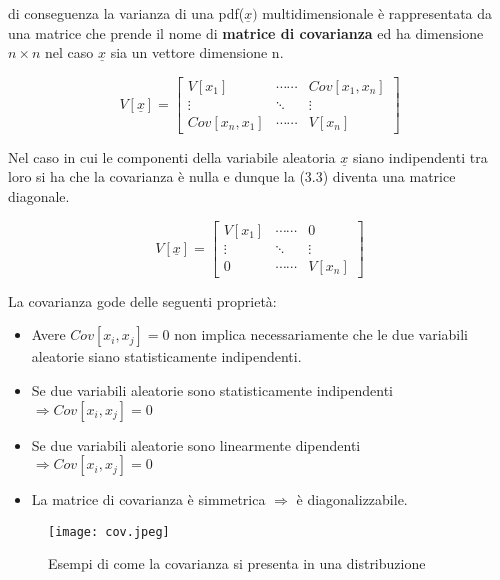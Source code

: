 \noindent di conseguenza la varianza di una pdf($\underline{x})$ multidimensionale \`{e} rappresentata da una matrice che prende il nome di \textbf{matrice di covarianza} ed ha dimensione $n \times n$ nel caso $\underline{x}$ sia un vettore dimensione n.

\begin{equation}
	V[\underline{x}] = \begin{bmatrix}
		V[x_1] & \cdots \cdots	& Cov[x_1,x_n] \\
		\vdots & \ddots & \vdots \\
		Cov[x_n,x_1] & \cdots \cdots & V[x_n]
	\end{bmatrix}
\end{equation}
\newline

\noindent Nel caso in cui le componenti della variabile aleatoria $\underline{x}$ siano indipendenti tra loro si ha che la covarianza \`{e} nulla e dunque la (3.3) diventa una matrice diagonale.

\begin{equation}
	V[\underline{x}] = \begin{bmatrix}
		V[x_1] & \cdots \cdots	& 0 \\
		\vdots &\ddots & \vdots \\
		0 & \cdots \cdots & V[x_n]
	\end{bmatrix}
\end{equation}
\newline

La covarianza gode delle seguenti propriet\`{a}:
\begin{itemize}
	\item Avere $Cov[x_i,x_j] = 0 $ non implica necessariamente che le due variabili aleatorie siano statisticamente indipendenti.
	\item Se due variabili aleatorie sono statisticamente indipendenti \\ $\Rightarrow Cov[x_i,x_j] = 0 $
	\item Se due variabili aleatorie sono linearmente dipendenti \\$\Rightarrow Cov[x_i,x_j] = 0 $
	\item  La matrice di covarianza \`{e} simmetrica $\Rightarrow$ \`{e} diagonalizzabile.
\end{itemize}
 
 
\begin{figure}[ht]

\texttt{[image: cov.jpeg]}	
\centering
\caption{Esempi di come la covarianza si presenta in una distribuzione}
\end{figure} 

